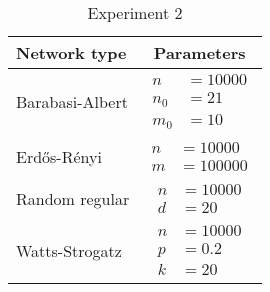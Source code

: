 \begin{table}[htbp]
  \centering
  \begin{tabular}{lc}
    \toprule
    Network type & Parameters \\
    \midrule
    Barabasi-Albert & $\begin{aligned} n &= \num{10000} \\ n_0 &= \num{21} \\ m_0 &= \num{10} \end{aligned}$\\
    \midrule
    Erd\H{o}s-R\'{e}nyi & $\begin{aligned} n &= \num{10000} \\ m &= \num{100000} \end{aligned}$\\
    \midrule
    Random regular & $\begin{aligned} n &= \num{10000} \\ d &= 20 \end{aligned}$\\
    \midrule
    Watts-Strogatz & $\begin{aligned} n &= \num{10000} \\ p &= \num{0.2} \\ k &= \num{20} \end{aligned}$\\
    \bottomrule
  \end{tabular}
  \caption[]{Experiment 2}
  \label{tab:network-parameters}
\end{table}


